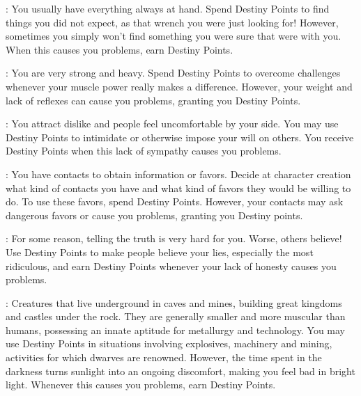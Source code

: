 \begin{multicols}{2}
\begin{ffcolpage}
: You usually have everything always at hand. Spend Destiny Points to find things you did not expect, as that wrench you were just looking for! However, sometimes you simply won’t find something you were sure that were with you. When this causes you problems, earn Destiny Points.
\end{ffcolpage} \pw

\begin{ffcolpage}
: You are very strong and heavy. Spend Destiny Points to overcome challenges whenever your muscle power really makes a difference. However, your weight and lack of reflexes can cause you problems, granting you Destiny Points.
\end{ffcolpage} \pw

\begin{ffcolpage}
: You attract dislike and people feel uncomfortable by your side. You may use Destiny Points to intimidate or otherwise impose your will on others. You receive Destiny Points when this lack of sympathy causes you problems.
\end{ffcolpage} \pw

\begin{ffcolpage}
: You have contacts to obtain information or favors. Decide at character creation what kind of contacts you have and what kind of favors they would be willing to do. To use these favors, spend Destiny Points. However, your contacts may ask dangerous favors or cause you problems, granting you Destiny points.
\end{ffcolpage} \pw

\begin{ffcolpage}
: For some reason, telling the truth is very hard for you. Worse, others believe! Use Destiny Points to make people believe your lies, especially the most ridiculous, and earn Destiny Points whenever your lack of honesty causes you problems.
\end{ffcolpage} \pw

\noindent\begin{minipage}{.35\textwidth-2\columnsep}
: Creatures that live underground in caves and mines, building great kingdoms and castles under the rock. They are generally smaller and more muscular than humans, possessing an innate aptitude for metallurgy and technology. You may use Destiny Points in situations involving explosives, machinery and mining, activities for which dwarves are renowned. However, the time spent in the darkness turns sunlight into an ongoing discomfort, making you feel bad in bright light. Whenever this causes you problems, earn Destiny Points.
\end{minipage} \pw


\end{multicols}
